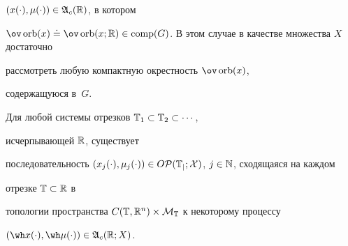 $(x(\cdot),\mu(\cdot))\in\frak A_{c}(\Bbb R)$, в котором


$\ov\orb(x)\doteq\ov\orb(x;\Bbb R)


\in\comp(G)$. В этом случае в качестве множества $X$ достаточно


рассмотреть любую компактную окрестность $\ov\orb(x)$,


содержащуюся в~$G$.








\begin{lems}


Для любой системы отрезков $\Bbb T_1\subset\Bbb T_2\subset\dotsb$,


исчерпывающей $\Bbb R$, существует


последовательность $(x_j(\cdot),\mu_j(\cdot))


\in O\cal P(\Bbb T_j;X)$, $j\in\Bbb N$, сходящаяся на каждом


отрезке $\Bbb T\subset\Bbb R$ в


топологии пространства $C(\Bbb T,\Bbb R^n)


\times\cal M_{\Bbb T}$ к некоторому процессу


$(\wh x(\cdot),\wh\mu(\cdot))\in\frak A_c(\Bbb R;X)$.


\end{lems}





